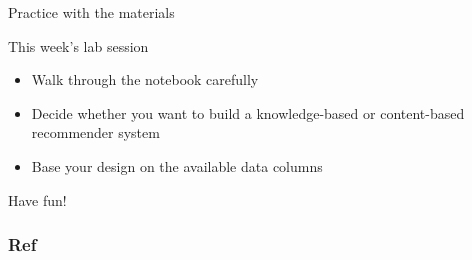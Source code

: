 \documentclass[compress]{beamer}
\begin{document}
\begin{frame}{Practice with the materials}
  \begin{exampleblock}{This week's lab session}
    \begin{itemize}[<+>]
      \item Walk through the notebook carefully
      \item Decide whether you want to build a knowledge-based or content-based recommender system
      \item Base your design on the available data columns
    \end{itemize}
  \end{exampleblock}
\end{frame}

\begin{frame}[standout]
  Have fun!
\end{frame}

\begin{frame}[t, allowframebreaks]
  \frametitle{Ref}
  \printbibliography
\end{frame}
\end{document}
